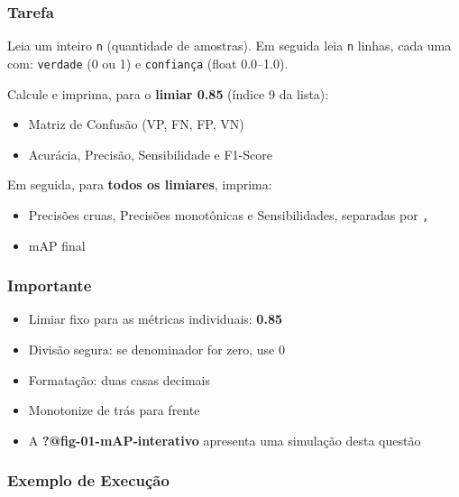 \documentclass[
  portuguese,
  letterpaper,
  openany,
  oneside,
  12pt,
  a4paper]{book}
\providecommand{\tightlist}{%
  \setlength{\itemsep}{0pt}\setlength{\parskip}{0pt}}
\begin{document}
\subsubsection{\texorpdfstring{
Tarefa}{ Tarefa}}\label{tarefa}

Leia um inteiro \texttt{n} (quantidade de amostras). Em seguida leia
\texttt{n} linhas, cada uma com: \texttt{verdade} (0 ou 1) e
\texttt{confiança} (float 0.0--1.0).

Calcule e imprima, para o \textbf{limiar 0.85} (índice 9 da lista):

\begin{itemize}
\tightlist
\item
  Matriz de Confusão (VP, FN, FP, VN)
\item
  Acurácia, Precisão, Sensibilidade e F1‑Score
\end{itemize}

Em seguida, para \textbf{todos os limiares}, imprima:

\begin{itemize}
\tightlist
\item
  Precisões cruas, Precisões monotônicas e Sensibilidades, separadas por
  \texttt{,}
\item
  mAP final
\end{itemize}

\subsubsection{\texorpdfstring{
Importante}{ Importante}}\label{importante}

\begin{itemize}
\tightlist
\item
  Limiar fixo para as métricas individuais: \textbf{0.85}
\item
  Divisão segura: se denominador for zero, use 0
\item
  Formatação: duas casas decimais
\item
  Monotonize de trás para frente
\item
  A \textbf{?@fig-01-mAP-interativo} apresenta uma simulação desta
  questão
\end{itemize}

\subsubsection{\texorpdfstring{ Exemplo de
Execução}{ Exemplo de Execução}}\label{exemplo-de-execuuxe7uxe3o-1}
\end{document}
